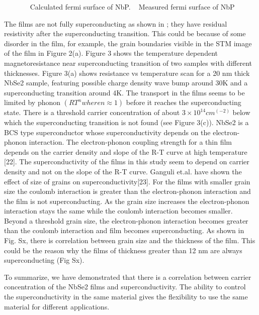 \begin{figure}
    \centering
    \caption{
        \sfA~ Calculated fermi surface of NbP.
        \sfB~ Measured fermi surface of NbP
    }
\end{figure}
The films are not fully superconducting as shown in ;
they have residual resistivity after the superconducting transition. This could 
be because of some disorder in the film, for example, the grain boundaries visible 
in the STM image of the film in Figure 2(a). Figure 3 shows the temperature 
dependent magnetoresistance near superconducting transition  of two samples with 
different thicknesses. Figure 3(a) shows resistance vs temperature scan for a 20 nm 
thick NbSe2 sample, featuring possible charge density wave bump around 30K and a 
superconducting transition around 4K. The transport in the films seems to be limited by 
phonon $(R T^n where n\approx1)$ before it reaches the superconducting state. There is a 
threshold carrier concentration of about $3×10^14  cm^(-2)$ below which the superconducting 
transition is not found (see Figure 3(c)). NbSe2 is a BCS type superconductor whose 
superconductivity depends on the electron-phonon interaction. The electron-phonon 
coupling strength for a thin film depends on the carrier density and slope of the 
R-T curve at high temperature [22]. The superconductivity of the films in this study 
seem to depend on carrier density and not on the slope of the R-T curve. Ganguli et.al. 
have shown the effect of size of grains on superconductivity[23]. For the films with smaller 
grain size the coulomb interaction is greater than the electron-phonon interaction and the 
film is not superconducting. As the grain size increases the electron-phonon interaction stays 
the same while the coulomb interaction becomes smaller. Beyond a threshold grain size, 
the electron-phonon interaction becomes greater than the coulomb interaction and film 
becomes superconducting. As shown in Fig. Sx, there is correlation between grain size 
and the thickness of the film. This could be the reason why the films of thickness greater 
than 12 nm are always superconducting (Fig Sx).

To summarize, we have demonstrated that there is a correlation between carrier 
concentration of the NbSe2 films and superconductivity. The ability to control the 
superconductivity in the same material gives the flexibility to use the same material 
for different applications.

